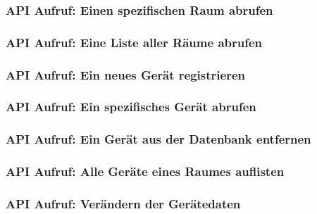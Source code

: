 \subsubsection{API Aufruf: Einen spezifischen Raum abrufen}
\label{app:API_show_room}

\subsubsection{API Aufruf: Eine Liste aller Räume abrufen}
\label{app:API_show_rooms}

\subsubsection{API Aufruf: Ein neues Gerät registrieren}
\label{app:API_register_device}

\subsubsection{API Aufruf: Ein spezifisches Gerät abrufen}
\label{app:API_get_device}

\subsubsection{API Aufruf: Ein Gerät aus der Datenbank entfernen}
\label{app:API_delete_device}

\subsubsection{API Aufruf: Alle Geräte eines Raumes auflisten}
\label{app:API_show_devices}

\subsubsection{API Aufruf: Verändern der Gerätedaten}
\label{app:API_patch_device}




%


